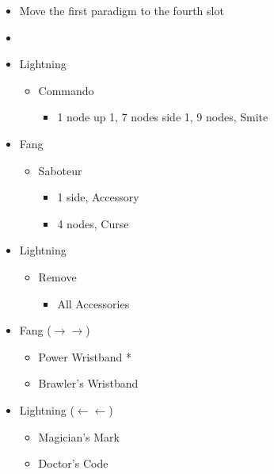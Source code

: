 \begin{menu}
		\begin{itemize}
			\paradigm
			\begin{itemize}
				\item Move the first paradigm to the fourth slot
				\item {}%
				      {\paradigmline{(\rav)}{\syn}{\sab}}%
				      {\paradigmline{(\rav)}{\rav}{(\sab)}}%
				      {\paradigmline{[\rav]}{(\rav)}{(\com)}}%
				      {\paradigmline[4]{\textit{\rav}}{\textit{\rav}}{\textit{\com}}}%
				      {\paradigmline{[\com]}{\rav}{\com}}%
				      {\paradigmline{[\com]}{\rav}{\com}}
			\end{itemize}
			\crystarium
			\begin{itemize}
				\item Lightning
				      \begin{itemize}
					      \item Commando
					            \begin{itemize}
						            \item 1 node up 1, 7 nodes side 1, 9 nodes, Smite
					            \end{itemize}
				      \end{itemize}
				\item Fang
				      \begin{itemize}
					      \item Saboteur
					            \begin{itemize}
						            \item 1 side, Accessory
						            \item 4 nodes, Curse
					            \end{itemize}
				      \end{itemize}
			\end{itemize}
			\equip
			\begin{itemize}
				\item Lightning
				      \begin{itemize}
					      \item Remove
					            \begin{itemize}
						            \item All Accessories
					            \end{itemize}
				      \end{itemize}
				\item Fang ($\rightarrow\rightarrow$)
				      \begin{itemize}
					      \item Power Wristband *
					      \item Brawler's Wristband
				      \end{itemize}
				\item Lightning ($\leftarrow\leftarrow$)
				      \begin{itemize}
					      \item Magician's Mark
					      \item Doctor's Code
				      \end{itemize}
			\end{itemize}
		\end{itemize}
\end{menu}
